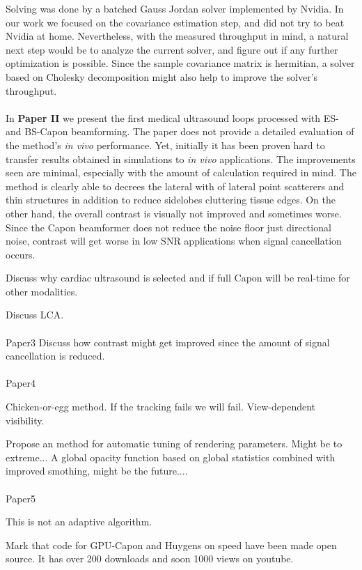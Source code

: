 Solving was done by a batched Gauss Jordan solver implemented by Nvidia. In our work we focused on the covariance estimation step, and did not try to beat Nvidia at home. Nevertheless, with the measured throughput in mind, a natural next step would be to analyze the current solver, and figure out if any further optimization is possible. Since the sample covariance matrix is hermitian, a solver based on Cholesky decomposition might also help to improve the solver's throughput.
\\\\
In \textbf{Paper II} we present the first medical ultrasound loops processed with ES- and BS-Capon beamforming.  The paper does not provide a detailed evaluation of the method's \textit{in vivo} performance. Yet, initially it has been proven hard to transfer results obtained in simulations to \textit{in vivo} applications. The improvements seen are minimal, especially with the amount of calculation required in mind. The method is clearly able to decrees the lateral with of lateral point scatterers and thin structures in addition to reduce sidelobes cluttering tissue edges. On the other hand, the overall contrast is visually not improved and sometimes worse. Since the Capon beamformer does not reduce the noise floor just directional noise, contrast will get worse in low SNR applications when signal cancellation occurs. 

Discuss why cardiac ultrasound is selected and if full Capon will be real-time for other modalities.

Discuss LCA.
\\\\
Paper3
Discuss how contrast might get improved since the amount of signal cancellation is reduced. 
\\\\
Paper4

Chicken-or-egg method. If the tracking fails we will fail. View-dependent visibility. 

Propose an method for automatic tuning of rendering parameters. Might be to extreme... A global opacity function based on global statistics combined with improved smothing, might be the future....
\\\\
Paper5

This is not an adaptive algorithm.

Mark that code for GPU-Capon and Huygens on speed have been made open source.
It has over 200 downloads and soon 1000 views on youtube.

